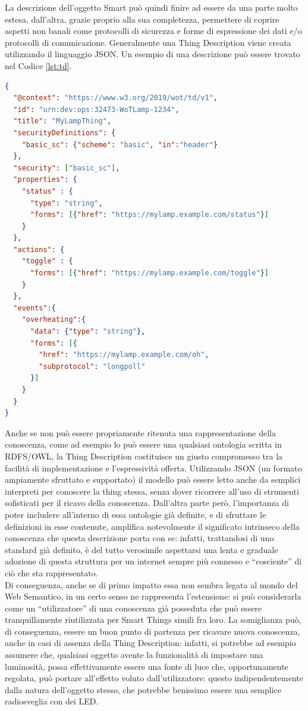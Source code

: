 \documentclass[12pt,a4paper,openright,oneside]{report}
\newcommand{\quotes}[1]{``#1''}
\begin{document}
La descrizione dell'oggetto Smart può quindi finire ad essere da una parte molto estesa, dall'altra, grazie proprio alla sua completezza, permettere di coprire aspetti non banali come protocolli di sicurezza e forme di espressione dei dati e/o protocolli di comunicazione.
Generalmente una Thing Description viene creata utilizzando il linguaggio JSON. Un esempio di una descrizione può essere trovato nel Codice \ref{lst:td}.

\begin{lstlisting}[language=json,caption={Esempio di una Thing Description},label=lst:td]
{
  "@context": "https://www.w3.org/2019/wot/td/v1",
  "id": "urn:dev:ops:32473-WoTLamp-1234",
  "title": "MyLampThing",
  "securityDefinitions": {
    "basic_sc": {"scheme": "basic", "in":"header"}
  },
  "security": ["basic_sc"],
  "properties": {
    "status" : {
      "type": "string",
      "forms": [{"href": "https://mylamp.example.com/status"}]
    }
  },
  "actions": {
    "toggle" : {
      "forms": [{"href": "https://mylamp.example.com/toggle"}]
    }
  },
  "events":{
    "overheating":{
      "data": {"type": "string"},
      "forms": [{
        "href": "https://mylamp.example.com/oh",
        "subprotocol": "longpoll"
      }]
    }
  }
}
\end{lstlisting}

Anche se non può essere propriamente ritenuta una rappresentazione della conoscenza, come ad esempio lo può essere una qualsiasi ontologia scritta in RDFS/OWL, la Thing Description costituisce un giusto compromesso tra la facilità di implementazione e l'espressività offerta. Utilizzando JSON (un formato ampiamente sfruttato e supportato) il modello può essere letto anche da semplici interpreti per conoscere la thing stessa, senza dover ricorrere all'uso di strumenti sofisticati per il ricavo della conoscenza. Dall'altra parte però, l'importanza di poter includere all'interno di essa ontologie già definite, e di sfruttare le definizioni in esse contenute, amplifica notevolmente il significato intrinseco della conoscenza che questa descrizione porta con se: infatti, trattandosi di uno standard già definito, è del tutto verosimile aspettarsi una lenta e graduale adozione di questa struttura per un internet sempre più connesso e \quotes{cosciente} di ciò che sta rappresentato.\\

Di conseguenza, anche se di primo impatto essa non sembra legata al mondo del Web Semantico, in un certo senso ne rappresenta l'estensione: si può considerarla come un \quotes{utilizzatore} di una conoscenza già posseduta che può essere tranquillamente riutilizzata per Smart Things simili fra loro. La somiglianza può, di conseguenza, essere un buon punto di partenza per ricavare nuova conoscenza, anche in casi di assenza della Thing Description: infatti, si potrebbe ad esempio assumere che, qualsiasi oggetto avente la funzionalità di impostare una luminosità, possa effettivamente essere una fonte di luce che, opportunamente regolata, può portare all'effetto voluto dall'utilizzatore: questo indipendentemente dalla natura dell'oggetto stesso, che potrebbe benissimo essere una semplice radiosveglia con dei LED.\\
\end{document}
